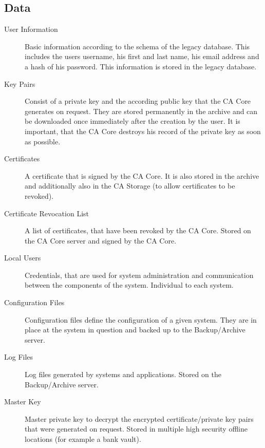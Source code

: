 \documentclass[a4paper, toc=index, 12pt, DIV14, twoside, BCOR2cm, headsepline, numbers=noenddot, bibliography=totoc]{report}
\begin{document}
\subsection{Data}
\begin{description}
\item[User Information ] Basic information according to the schema of the legacy database. This includes the users username, his first and last name, his email address and a hash of his password. This information is stored in the legacy database.

\item[Key Pairs ] Consist of a private key and the according public key that the CA Core generates on request. They are stored permanently in the archive and can be downloaded once immediately after the creation by the user. It is important, that the CA Core destroys his record of the private key as soon as possible.

\item[Certificates ] A certificate that is signed by the CA Core. It is also stored in the archive and additionally also in the CA Storage (to allow certificates to be revoked).

\item[Certificate Revocation List ] A list of certificates, that have been revoked by the CA Core. Stored on the CA Core server and signed by the CA Core.

\item[Local Users ] Credentials, that are used for system administration and communication between the components of the system. Individual to each system.

\item[Configuration Files ] Configuration files define the configuration of a given system. They are in place at the system in question and backed up to the Backup/Archive server.

\item[Log Files ] Log files generated by systems and applications. Stored on the Backup/Archive server.

\item[Master Key ] Master private key to decrypt the encrypted certificate/private key pairs that were generated on request. Stored in multiple high security offline locations (for example a bank vault).
\end{description}
\end{document}
